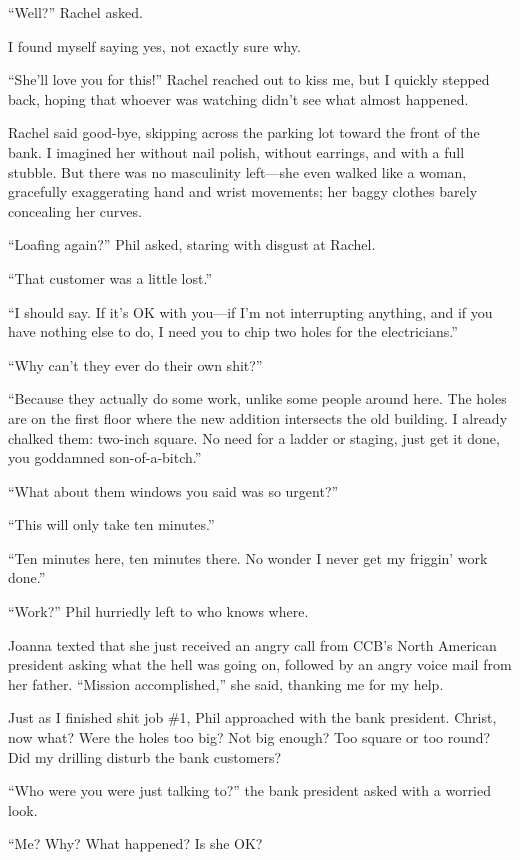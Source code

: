 \noindent ``Well?'' Rachel asked.

I found myself saying yes, not exactly sure why.

``She'll love you for this!'' Rachel reached out to kiss me, but I
quickly stepped back, hoping that whoever was watching didn't see what
almost happened.

Rachel said good-bye, skipping across the parking lot toward the front
of the bank. I imagined her without nail polish, without earrings, and
with a full stubble. But there was no masculinity left---she even walked
like a woman, gracefully exaggerating hand and wrist movements; her
baggy clothes barely concealing her curves.

``Loafing again?'' Phil asked, staring with disgust at Rachel.

``That customer was a little lost.''

``I should say. If it's OK with you---if I'm not interrupting anything,
and if you have nothing else to do, I need you to chip two holes for the
electricians.''

``Why can't they ever do their own shit?''

``Because they actually do some work, unlike some people around here.
The holes are on the first floor where the new addition intersects the
old building. I already chalked them: two-inch square. No need for a
ladder or staging, just get it done, you goddamned son-of-a-bitch.''

``What about them windows you said was so urgent?''

``This will only take ten minutes.''

``Ten minutes here, ten minutes there. No wonder I never get my friggin'
work done.''

``Work?'' Phil hurriedly left to who knows where.

Joanna texted that she just received an angry call from CCB's North
American president asking what the hell was going on, followed by an
angry voice mail from her father. ``Mission accomplished,'' she said,
thanking me for my help.

Just as I finished shit job \#1, Phil approached with the bank
president. Christ, now what? Were the holes too big? Not big enough? Too
square or too round? Did my drilling disturb the bank customers?

``Who were you were just talking to?'' the bank president asked with a
worried look.

``Me? Why? What happened? Is she OK?

